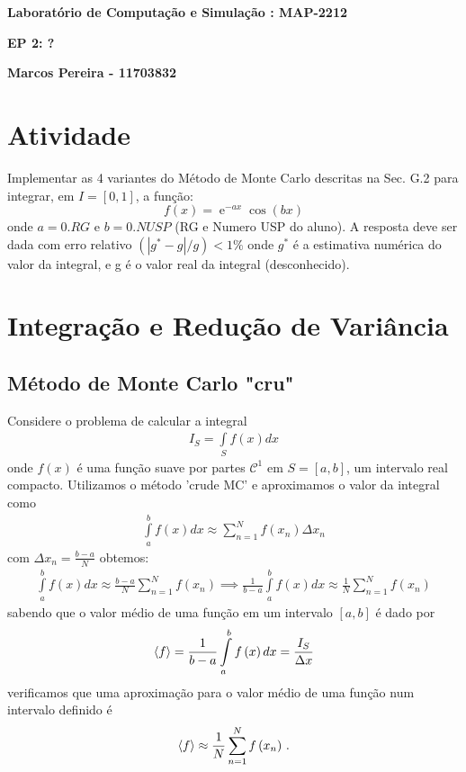 \documentclass{article}
\DeclareMathOperator{\e}{\mathrm{e}}
\begin{document}
	
\begin{figure}[h!]
\end{figure}


\begin{center}
	{\large \textbf{Laboratório de Computação e Simulação : MAP-2212}}
	
	{\Large\textbf{EP 2: ?}}
	
	{\large\textbf{Marcos Pereira -  11703832}}

\end{center}

\section*{Atividade}

Implementar as 4 variantes do Método de Monte Carlo descritas na Sec. G.2 para integrar, em $I=\left[0, 1\right]$, a função:
$$f(x)=\e^{-ax}\cos(bx)$$ onde $a= 0.RG$   e $b=0.NUSP$  (RG e Numero USP do aluno).
A resposta deve ser dada com erro relativo $(  | g^* - g | / g  )  <  1\%$ onde $g^*$ é a estimativa numérica do valor da integral, e g é o valor real da integral (desconhecido). 


\section{Integração e Redução de Variância}

\subsection{Método de Monte Carlo "cru"}
Considere o problema de calcular a integral
\begin{align}
    I_S=\int\limits_{S}f(x)dx
\end{align}
onde $f(x)$ é uma função suave por partes $\mathcal{C}^1$ em $S=\left[a,b\right]$, um intervalo real compacto. Utilizamos o método 'crude MC' e aproximamos o valor da integral como
\begin{align*}
        \int\limits_{a}^{b}f(x)dx\approx \sum_{n=1}^{N}f\left(x_n\right)\Delta x_n
\end{align*}
com $\Delta x_n=\frac{b-a}{N}$ obtemos:
\begin{align}
    \int\limits_{a}^{b}f(x)dx\approx \frac{b-a}{N}\sum_{n=1}^{N}f\left(x_n\right)\implies \frac{1}{b-a}\int\limits_{a}^{b}f\left(x\right)dx\approx \frac{1}{N}\sum_{n=1}^{N}f\left(x_n\right)
\end{align}
sabendo que o valor médio de uma função em um intervalo $[a,b]$ é dado por
\begin{align*}
    \braket{f}=\frac{1}{b-a}\int\limits_{a}^{b}f\left(x\right)dx=\frac{I_S}{\Delta x}
\end{align*}
verificamos que uma aproximação para o valor médio de uma função num intervalo definido é
\begin{align}\label{eq3}
    \braket{f}\approx \frac{1}{N}\sum_{n=1}^{N}f\left(x_n\right)\,.
\end{align}
\end{document}
